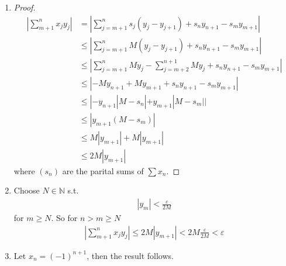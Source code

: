 \begin{enumerate}[label=(\alph*)]
    \item 
    \begin{proof}
        \begin{align*}
            |\sum_{m+1}^n x_j y_j| &= |\sum_{j=m+1}^{n} s_j (y_j - y_{j+1}) + s_ny_{n+1}-  s_m y_{m+1}| \\
            &\leq  |\sum_{j=m+1}^{n} M (y_j - y_{j+1}) + s_ny_{n+1}-  s_m y_{m+1}| \\
            &\leq  |\sum_{j=m+1}^{n} M y_j - \sum_{j=m+2}^{n+1} M y_{j} + s_ny_{n+1}-  s_m y_{m+1}| \\
            &\leq  | -My_{n+1} + My_{m+1} + s_ny_{n+1}-  s_m y_{m+1}| \\
            &\leq  | -y_{n+1}|M-s_n| + y_{m+1}|M - s_m|| \\
            &\leq  | y_{m+1}(M - s_m)| \\
            &\leq  M | y_{m+1}| + M | y_{m+1}| \\
            &\leq 2M |y_{m+1}| 
        \end{align*}
        where $(s_n)$ are the parital sums of $\sum x_n$.
    \end{proof}

    \item
    Choose $N\in \mathbb{N}$ s.t.
    \begin{align*}
        |y_{m}| < \frac{\varepsilon}{2M}
    \end{align*} 
    for $m \geq N$. So for $n > m \geq N$
    \begin{align*}
        |\sum_{m+1}^n x_j y_j| \leq 2M|y_{m+1}| < 2M \frac{\varepsilon}{2M} < \varepsilon
    \end{align*}

    \item
    Let $x_n = (-1)^{n+1}$, then the result follows.
\end{enumerate}

